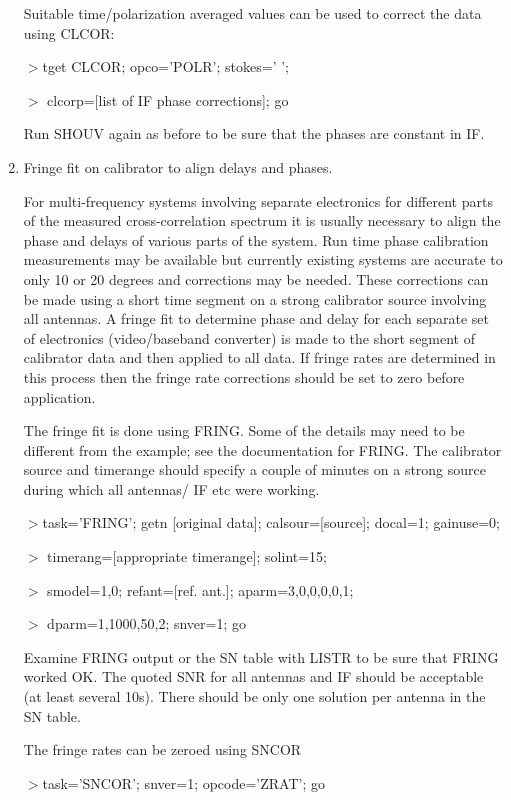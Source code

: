 \begin{enumerate}
Suitable time/polarization averaged values can be used to
correct the data using CLCOR:
\par\noindent
$>$tget CLCOR; opco='POLR'; stokes=' ';
\par\noindent
$>$ clcorp=[list of IF phase corrections]; go
\par\noindent
Run SHOUV again as before to be sure that the phases are constant in
IF.

\item Fringe fit on calibrator to align delays and phases.

   For multi-frequency systems involving separate electronics for
different parts of the measured cross-correlation spectrum it is
usually necessary to align the phase and delays of various parts of
the system.  Run time phase calibration measurements may be available
but currently existing systems are accurate to only 10 or 20 degrees
and corrections may be needed.  These corrections can be made using a
short time segment on a strong calibrator source involving all
antennas. A fringe fit to determine phase and delay for each separate
set of electronics (video/baseband converter) is made to the short
segment of calibrator data and then applied to all data.  If fringe
rates are determined in this process then the fringe rate corrections
should be set to zero before application.

   The fringe fit is done using FRING.  Some of the details may need to
be different from the example; see the documentation for FRING.  The
calibrator source and timerange should specify a couple of minutes on a
strong source during which all antennas/ IF etc were working.
\par\noindent
$>$task='FRING'; getn [original data]; calsour=[source]; docal=1; gainuse=0;
\par\noindent
$>$ timerang=[appropriate timerange]; solint=15;
\par\noindent
$>$ smodel=1,0; refant=[ref. ant.]; aparm=3,0,0,0,0,1;
\par\noindent
$>$ dparm=1,1000,50,2; snver=1; go

   Examine FRING output or the SN table with LISTR to be sure that
FRING worked OK.  The quoted SNR for all antennas and IF should be
acceptable (at least several 10s).  There should be only one solution
per antenna in the SN table.

   The fringe rates can be zeroed using SNCOR
\par\noindent
$>$task='SNCOR'; snver=1; opcode='ZRAT'; go



\end{enumerate}
